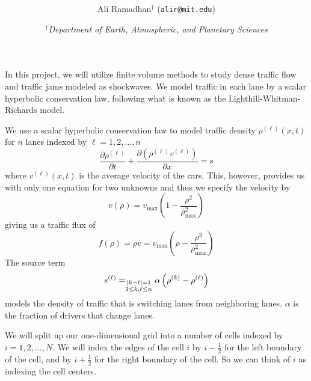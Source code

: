\documentclass[11pt]{article}
\title{\spacedlowsmallcaps{6.339: Numerical Methods for Partial Differential Equations}\\ \spacedlowsmallcaps{Project two: Finite Volume Methods}}
\author{Ali Ramadhan$^\text{†}$ (\texttt{alir@mit.edu})}
\date{\textit{$^\text{†}$Department of Earth, Atmospheric, and Planetary Sciences}}
\let\sumop\relax
\begin{document}
\maketitle

In this project, we will utilize finite volume methods to study dense traffic flow and traffic jams modeled as shockwaves. We model traffic in each lane by a scalar hyperbolic conservation law, following what is known as the Lighthill-Whitman-Richards model.

We use a scalar hyperbolic conservation law to model traffic density $\rho^{(\ell)}(x,t)$ for $n$ lanes indexed by $\ell = 1,2,\dots,n$
\begin{equation} \label{eq:conservationLaw}
	\frac{\partial \rho^{(\ell)}}{\partial t} + \frac{\partial (\rho^{(\ell)} v^{(\ell)})}{\partial x} = s
\end{equation}
where $v^{(\ell)}(x,t)$ is the average velocity of the cars. This, however, provides us with only one equation for two unknowns and thus we specify the velocity by
\begin{equation} \label{eq:velocity}
	v(\rho) = v_\mathrm{max} \left( 1 - \frac{\rho^2}{\rho_\mathrm{max}^2} \right)
\end{equation}
giving us a traffic flux of 
\begin{equation} \label{eq:flux}
f(\rho) = \rho v = v_\mathrm{max} \left( \rho - \frac{\rho^3}{\rho_\mathrm{max}^2} \right)
\end{equation}
The source term
\begin{equation} \label{eq:source}
	s^{(\ell)} = \sumop_{\substack{|k-\ell|=1 \\ 1 \le k,\ell \le n}} \alpha \left( \rho^{(k)} - \rho^{(\ell)} \right)
\end{equation}
models the density of traffic that is switching lanes from neighboring lanes. $\alpha$ is the fraction of drivers that change lanes.

We will split up our one-dimensional grid into a number of cells indexed by $i=1,2,\ldots,N$. We will index the edges of the cell $i$ by $i-\frac{1}{2}$ for the left boundary of the cell, and by $i+\frac{1}{2}$ for the right boundary of the cell. So we can think of $i$ as indexing the cell centers.
\end{document}
